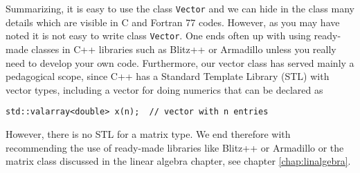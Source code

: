 Summarizing, it is easy to use the class \verb?Vector?
and we can hide in the class many details which are visible in C and Fortran 77 codes.  However, as you may have noted 
it is not easy to write class \verb?Vector?.
One ends often up with using ready-made classes in C++ libraries such as Blitz++ or Armadillo
unless you really need to develop your own code.
Furthermore, 
our vector class has served mainly a pedagogical scope, since 
C++ has a Standard Template Library (STL) with
vector types, including a vector for doing numerics  that can be declared as 
\begin{lstlisting}
std::valarray<double> x(n);  // vector with n entries
\end{lstlisting}
However, there is no STL for a matrix type.  
We end therefore with recommending the use of ready-made libraries like Blitz++ or Armadillo
or the matrix class discussed in the linear algebra chapter, see chapter \ref{chap:linalgebra}.

